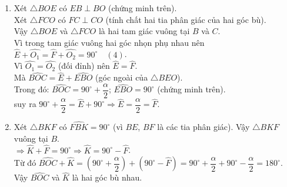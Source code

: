 \begin{vd}
{\begin{enumerate}
		Vậy \[\widehat{B_1}+\widehat{C_1}=\dfrac{\widehat{B}}{2}+\dfrac{\widehat{C}}{2}=\dfrac{1}{2}\left( \widehat{B}+\widehat{C}\right) \tag{1}\]
		mà $\widehat{A}+\widehat{B}+\widehat{C}=180^\circ$ (tổng các góc trong tam giác).
		\[\Rightarrow \widehat{B}+\widehat{C}=180^\circ-\widehat{A}=180^\circ-\alpha \tag{2}\]
		Xét $\triangle BOC$ có: $\widehat{BOC}+\widehat{B_1}+\widehat{C_1}=180^\circ$ (tính chất)
		\[\Rightarrow \widehat{BOC}=180^\circ-\left( \widehat{B_1}+\widehat{C_1}\right) 
	 \tag{3}\]
	 mà $\widehat{B_1}+\widehat{C_1}=\dfrac{1}{2}\left( \widehat{B}+\widehat{C}\right)=\dfrac{1}{2}\left( 180^\circ-\alpha\right) $\\
	 Thay vào $(3)$ ta có
	 \[\Rightarrow \widehat{BOC}=180^\circ-\dfrac{1}{2}
	 \left( 180^\circ-\alpha\right)\]
	 Vậy  \[\Rightarrow\widehat{BOC}=90^\circ+\dfrac{\alpha}{2}.\]
	 \item Xét $\triangle BOE$ có $EB\perp BO$ (chứng minh trên).\\
	 Xét $\triangle FCO$ có $FC\perp CO$ (tính chất hai tia phân giác của hai góc bù).\\
	 Vậy $\triangle BOE$ và $\triangle FCO$ là hai tam giác vuông tại $B$ và $C$.\\
	 Vì trong tam giác vuông hai góc nhọn phụ nhau nên $\widehat{E}+\widehat{O_1}=\widehat{F}+\widehat{O_2}=90^\circ \quad (4)$.\\
	 Vì $\widehat{O_1}=\widehat{O_2}$ (đối đỉnh) nên $\widehat{E}=\widehat{F}$.\\
	 Mà $\widehat{BOC}=\widehat{E}+\widehat{EBO}$ (góc ngoài của $\triangle BEO$). \\
	 Trong đó: $\widehat{BOC}=90^\circ+\dfrac{\alpha}{2}$; $\widehat{EBO}=90^\circ$ (chứng minh trên).\\
	  suy ra $90^\circ+\dfrac{\alpha}{2}=\widehat{E}+90^\circ\Rightarrow \widehat{E}=\dfrac{\alpha}{2}=\widehat{F}$. 
	 \item Xét $\triangle BKF$ có $\widehat{FBK}=90^\circ$ (vì $BE$, $BF$ là các tia phân giác). Vậy $\triangle BKF$ vuông tại $B$.\\
	 $\Rightarrow \widehat{K}+\widehat{F}=90^\circ \Rightarrow \widehat{K}=90^\circ-\widehat{F}$.\\
	 Từ đó $\widehat{BOC}+\widehat{K}=\left( 90^\circ+\dfrac{\alpha}{2}\right) +\left( 90^\circ-\widehat{F}\right) = 90^\circ+\dfrac{\alpha}{2} + 90^\circ-\dfrac{\alpha}{2}=180^\circ$.\\
	 Vậy $\widehat{BOC}$ và $\widehat{K}$ là hai góc bù nhau.
	\end{enumerate}
}
\end{vd}
